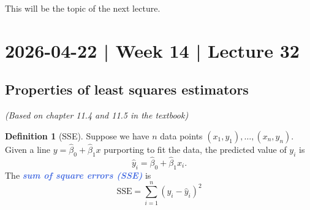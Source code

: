 \documentclass[10pt]{article}
\theoremstyle{definition}
\newtheorem{definition}[theorem]{Definition}
\newcommand{\1}[1]{\textbf{1}_{\left[#1\right]}} %
\newcommand{\demph}[1]{\textcolor{RoyalBlue}{\textbf{\slshape #1}}} %
\begin{document}
This will be the topic of the next lecture.
\newpage
\section{2026-04-22 | Week 14 | Lecture 32}

\subsection{Properties of least squares estimators}
\textit{(Based on chapter 11.4 and 11.5 in the textbook)}


\begin{definition}[SSE]
  \label{def:sse}
  Suppose we have $n$ data points $(x_{1},y_{1}),\ldots, (x_{n},y_{n})$. Given
  a line $y=\widehat{\beta}_{0}+\widehat{\beta}_{1}x$ purporting to fit the data, the predicted
  value of $y_{i}$ is
  \begin{equation*}
    \widehat{y}_{i} = \widehat{\beta}_{0}+\widehat{\beta}_{1}x_{i}.
  \end{equation*}
  The \demph{sum of square errors (SSE)} is
  \begin{equation*}
    \text{SSE} = \sum_{i=1}^{n}(y_{i}-\widehat{y}_{i})^{2} %
  \end{equation*}
\end{definition}
\end{document}

